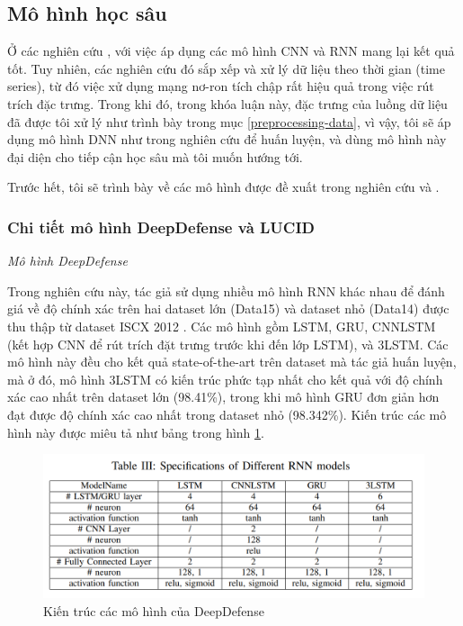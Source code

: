 \subsection{Mô hình học sâu}

Ở các nghiên cứu \cite{27-Corin}, \cite{28-Yuan} với việc áp dụng các mô hình CNN và RNN mang lại kết quả tốt. Tuy nhiên, các nghiên cứu đó sắp xếp và xử lý dữ liệu theo thời gian (time series), từ đó việc xử dụng mạng nơ-ron tích chập rất hiệu quả trong việc rút trích đặc trưng. Trong khi đó, trong khóa luận này, đặc trưng của luồng dữ liệu đã được tôi xử lý như trình bày trong mục \ref{preprocessing-data}, vì vậy, tôi sẽ áp dụng mô hình DNN như trong nghiên cứu \cite{61-Basnet} để huấn luyện, và dùng mô hình này đại diện cho tiếp cận học sâu mà tôi muốn hướng tới.

Trước hết, tôi sẽ trình bày về các mô hình được đề xuất trong nghiên cứu \cite{27-Corin} và \cite{28-Yuan}.

\subsubsection{Chi tiết mô hình DeepDefense và LUCID}

\textit{Mô hình DeepDefense}\cite{28-Yuan}

Trong nghiên cứu này, tác giả sử dụng nhiều mô hình RNN khác nhau để đánh giá về độ chính xác trên hai dataset lớn (Data15) và dataset nhỏ (Data14) được thu thập từ dataset ISCX 2012 \cite{35-Shiravi}. Các mô hình gồm LSTM, GRU, CNNLSTM (kết hợp CNN để rút trích đặt trưng trước khi đến lớp LSTM), và 3LSTM. Các mô hình này đều cho kết quả state-of-the-art trên dataset mà tác giả huấn luyện, mà ở đó, mô hình 3LSTM có kiến trúc phức tạp nhất cho kết quả với độ chính xác cao nhất trên dataset lớn (98.41\%), trong khi mô hình GRU đơn giản hơn đạt được độ chính xác cao nhất trong dataset nhỏ (98.342\%). Kiến trúc các mô hình này được miêu tả như bảng trong hình \ref{fig:deep-defense-architecture}.

 \begin{figure}[ht!]
	\centering
	\includegraphics[width=\linewidth]{fig/deep-defense-architecture.png}
	\caption{Kiến trúc các mô hình của DeepDefense \cite{28-Yuan}}
	\label{fig:deep-defense-architecture}
\end{figure}

